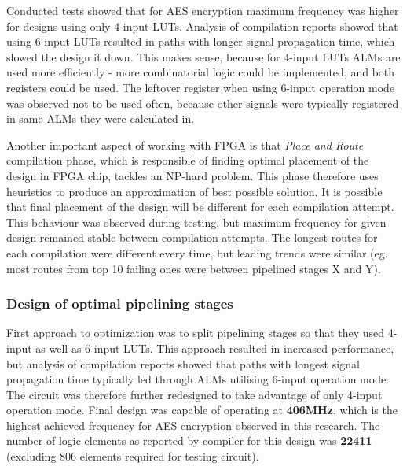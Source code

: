 Conducted tests showed that for AES encryption maximum frequency was higher for designs using only 4-input LUTs. Analysis of compilation reports showed that using 6-input LUTs resulted in paths with longer signal propagation time, which slowed the design it down. This makes sense, because for 4-input LUTs ALMs are used more efficiently - more combinatorial logic could be implemented, and both registers could be used. The leftover register when using 6-input operation mode was observed not to be used often, because other signals were typically registered in same ALMs they were calculated in.

Another important aspect of working with FPGA is that \textit{Place and Route} compilation phase, which is responsible of finding optimal placement of the design in FPGA chip, tackles an NP-hard problem. This phase therefore uses heuristics to produce an approximation of best possible solution. It is possible that final placement of the design will be different for each compilation attempt. This behaviour was observed during testing, but maximum frequency for given design remained stable between compilation attempts. The longest routes for each compilation were different every time, but leading trends were similar (eg. most routes from top 10 failing ones were between pipelined stages X and Y).




\subsubsection{Design of optimal pipelining stages}
\label{sec:pipeline-stages-design}

First approach to optimization was to split pipelining stages so that they used 4-input as well as 6-input LUTs. This approach resulted in increased performance, but analysis of compilation reports showed that paths with longest signal propagation time typically led through ALMs utilising 6-input operation mode. The circuit was therefore further redesigned to take advantage of only 4-input operation mode. Final design was capable of operating at \textbf{406MHz}, which is the highest achieved frequency for AES encryption observed in this research. The number of logic elements as reported by compiler for this design was \textbf{22411} (excluding 806 elements required for testing circuit).

